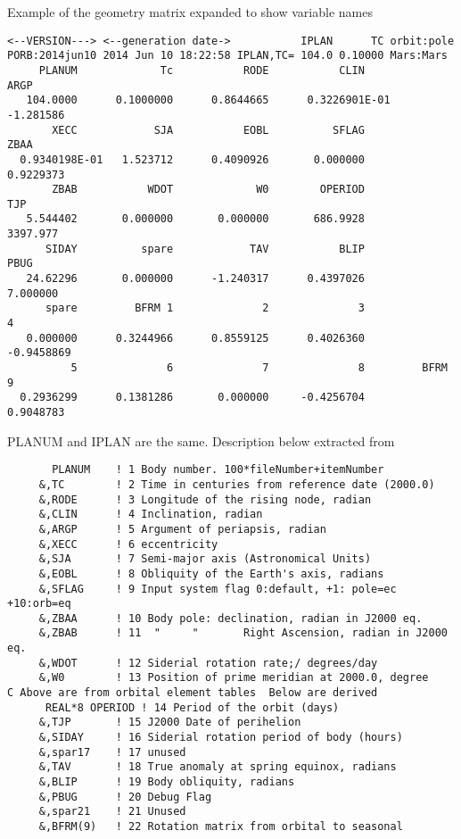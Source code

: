 \documentclass[draft]{article}
\begin{document}
Example of the geometry matrix expanded to show variable names
\vspace{-3.mm} 
\begin{verbatim}
<--VERSION---> <--generation date->           IPLAN      TC orbit:pole    
PORB:2014jun10 2014 Jun 10 18:22:58 IPLAN,TC= 104.0 0.10000 Mars:Mars
     PLANUM             Tc           RODE           CLIN           ARGP
   104.0000      0.1000000      0.8644665      0.3226901E-01  -1.281586  
       XECC            SJA           EOBL          SFLAG           ZBAA
  0.9340198E-01   1.523712      0.4090926       0.000000      0.9229373 
       ZBAB           WDOT             W0        OPERIOD            TJP 
   5.544402       0.000000       0.000000       686.9928       3397.977 
      SIDAY          spare            TAV           BLIP           PBUG 
   24.62296       0.000000      -1.240317      0.4397026       7.000000  
      spare         BFRM 1              2              3              4
   0.000000      0.3244966      0.8559125      0.4026360     -0.9458869 
          5              6              7              8         BFRM 9  
  0.2936299      0.1381286       0.000000     -0.4256704      0.9048783   
\end{verbatim} 

PLANUM and IPLAN are the same. Description below extracted from 
\vspace{-3.mm} 
\begin{verbatim}
       PLANUM    ! 1 Body number. 100*fileNumber+itemNumber
     &,TC        ! 2 Time in centuries from reference date (2000.0)
     &,RODE      ! 3 Longitude of the rising node, radian
     &,CLIN      ! 4 Inclination, radian
     &,ARGP      ! 5 Argument of periapsis, radian
     &,XECC      ! 6 eccentricity
     &,SJA       ! 7 Semi-major axis (Astronomical Units)
     &,EOBL      ! 8 Obliquity of the Earth's axis, radians
     &,SFLAG     ! 9 Input system flag 0:default, +1: pole=ec +10:orb=eq
     &,ZBAA      ! 10 Body pole: declination, radian in J2000 eq.
     &,ZBAB      ! 11  "     "       Right Ascension, radian in J2000 eq.
     &,WDOT      ! 12 Siderial rotation rate;/ degrees/day  
     &,W0        ! 13 Position of prime meridian at 2000.0, degree
C Above are from orbital element tables  Below are derived    
      REAL*8 OPERIOD ! 14 Period of the orbit (days)
     &,TJP       ! 15 J2000 Date of perihelion
     &,SIDAY     ! 16 Siderial rotation period of body (hours)
     &,spar17    ! 17 unused
     &,TAV       ! 18 True anomaly at spring equinox, radians
     &,BLIP      ! 19 Body obliquity, radians
     &,PBUG      ! 20 Debug Flag   
     &,spar21    ! 21 Unused    
     &,BFRM(9)   ! 22 Rotation matrix from orbital to seasonal
\end{verbatim}
\end{document}
